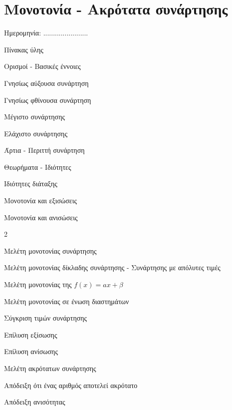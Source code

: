 \documentclass[twoside,nofonts,internet,math,spyros]{frontisthrio}
\newcommand{\myitem}{\stepcounter{enumi}\item[\raisebox{0.5mm}{\faEdit}\ \Large$\square$]}
\begin{document}
\section{Μονοτονία - Ακρότατα συνάρτησης}
\begin{flushright}
\faCalendar* Ημερομηνία: .......................
\end{flushright}
\begin{mybox}[mysubtitle]{Πίνακας ύλης}
\begin{tcbraster}[raster columns=2,raster equal height]
\begin{myleftbox}{Ορισμοί - Βασικές έννοιες\ \ \faBook}
\begin{arithmisi}[itemsep=0mm]
\item Γνησίως αύξουσα συνάρτηση
\item Γνησίως φθίνουσα συνάρτηση
\item Μέγιστο συνάρτησης
\item Ελάχιστο συνάρτησης
\item Άρτια - Περιττή συνάρτηση
\end{arithmisi}
\end{myleftbox}
\begin{myrightbox}{Θεωρήματα - Ιδιότητες\ \ \faTools}
\begin{arithmisi}[itemsep=0mm]
\item Ιδιότητες διάταξης
\item Μονοτονία και εξισώσεις
\item Μονοτονία και ανισώσεις
\end{arithmisi}
\end{myrightbox}
\end{tcbraster}
\begin{multicols}{2}
\begin{todolist}[itemsep=0mm]
\myitem Μελέτη μονοτονίας συνάρτησης
\item Μελέτη μονοτονίας δίκλαδης συνάρτησης - Συνάρτησης με απόλυτες τιμές
\item Μελέτη μονοτονίας της $ f(x)=ax+\beta $
\item Μελέτη μονοτονίας σε ένωση διαστημάτων
\item Σύγκριση τιμών συνάρτησης
\item Επίλυση εξίσωσης
\item Επίλυση ανίσωσης
\item Μελέτη ακρότατων συνάρτησης
\item Απόδειξη ότι ένας αριθμός αποτελεί ακρότατο
\item Απόδειξη ανισότητας

\end{todolist}
\end{multicols}
\end{mybox}
\end{document}
